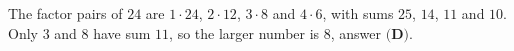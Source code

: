 The factor pairs of $24$ are $1\cdot24$, $2\cdot12$, $3\cdot8$ and $4\cdot6$, with sums $25$, $14$, $11$ and $10$. Only $3$ and $8$ have sum $11$, so the larger number is $\boxed{8}$, answer $\textbf{(D)}$.
